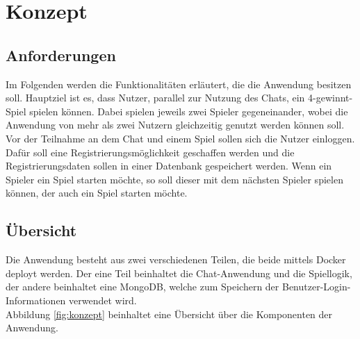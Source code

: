 
\chapter{Konzept}\label{cha:Konzept}
\section{Anforderungen}\label{sec:Anforderungen}
Im Folgenden werden die Funktionalitäten erläutert, die die Anwendung besitzen soll. Hauptziel ist es, dass Nutzer, parallel zur Nutzung des Chats, ein 4-gewinnt-Spiel spielen können. Dabei spielen jeweils zwei Spieler gegeneinander, wobei die Anwendung von mehr als zwei Nutzern gleichzeitig genutzt werden können soll. Vor der Teilnahme an dem Chat und einem Spiel sollen sich die Nutzer einloggen. Dafür soll eine Registrierungsmöglichkeit geschaffen werden und die Registrierungsdaten sollen in einer Datenbank gespeichert werden. Wenn ein Spieler ein Spiel starten möchte, so soll dieser mit dem nächsten Spieler spielen können, der auch ein Spiel starten möchte.
\section{Übersicht}\label{sec:Übersicht}
Die Anwendung besteht aus zwei verschiedenen Teilen, die beide mittels Docker deployt werden. 
Der eine Teil beinhaltet die Chat-Anwendung und die Spiellogik, der andere beinhaltet eine MongoDB, welche zum Speichern der Benutzer-Login-Informationen verwendet wird.\\
Abbildung \ref{fig:konzept} beinhaltet eine Übersicht über die Komponenten der Anwendung.

